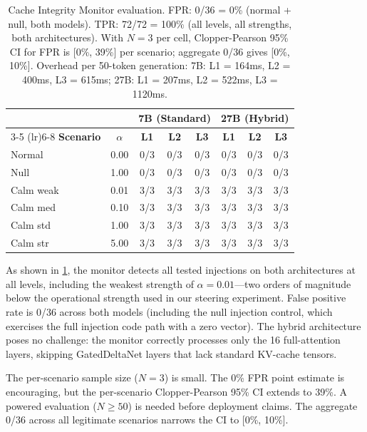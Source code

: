 \begin{table}[h]
\centering
\small
\begin{tabular}{lccccccc}
\toprule
& & \multicolumn{3}{c}{\textbf{7B (Standard)}} & \multicolumn{3}{c}{\textbf{27B (Hybrid)}} \\
\cmidrule(lr){3-5} \cmidrule(lr){6-8}
\textbf{Scenario} & \textbf{$\alpha$} & \textbf{L1} & \textbf{L2} & \textbf{L3} & \textbf{L1} & \textbf{L2} & \textbf{L3} \\
\midrule
Normal    & 0.00 & 0/3 & 0/3 & 0/3 & 0/3 & 0/3 & 0/3 \\
Null      & 1.00 & 0/3 & 0/3 & 0/3 & 0/3 & 0/3 & 0/3 \\
Calm weak & 0.01 & 3/3 & 3/3 & 3/3 & 3/3 & 3/3 & 3/3 \\
Calm med  & 0.10 & 3/3 & 3/3 & 3/3 & 3/3 & 3/3 & 3/3 \\
Calm std  & 1.00 & 3/3 & 3/3 & 3/3 & 3/3 & 3/3 & 3/3 \\
Calm str  & 5.00 & 3/3 & 3/3 & 3/3 & 3/3 & 3/3 & 3/3 \\
\bottomrule
\end{tabular}
\caption{Cache Integrity Monitor evaluation. FPR: 0/36 = 0\%
(normal + null, both models). TPR: 72/72 = 100\% (all levels, all
strengths, both architectures). With $N = 3$ per cell, Clopper-Pearson
95\% CI for FPR is [0\%, 39\%] per scenario; aggregate 0/36 gives
[0\%, 10\%]. Overhead per 50-token generation: 7B: L1 = 164ms,
L2 = 400ms, L3 = 615ms; 27B: L1 = 207ms, L2 = 522ms, L3 = 1120ms.}
\label{tab:cim_eval}
\end{table}

As shown in \cref{tab:cim_eval}, the monitor detects all tested
injections on both architectures at all levels, including the weakest
strength of $\alpha = 0.01$---two orders of magnitude below the
operational strength used in our steering experiment. False positive rate is 0/36 across both models (including
the null injection control, which exercises the full injection code path
with a zero vector). The hybrid architecture poses no challenge: the
monitor correctly processes only the 16 full-attention layers, skipping
GatedDeltaNet layers that lack standard KV-cache tensors.

The per-scenario sample size ($N = 3$) is small. The 0\% FPR point
estimate is encouraging, but the per-scenario Clopper-Pearson 95\% CI
extends to 39\%. A powered evaluation ($N \geq 50$) is needed before
deployment claims. The aggregate 0/36 across all legitimate scenarios
narrows the CI to [0\%, 10\%].

